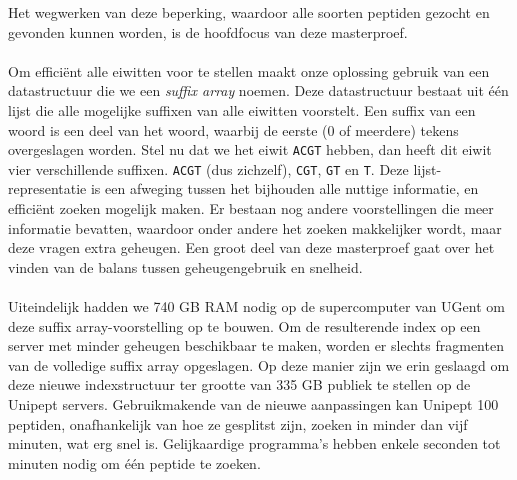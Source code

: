 Het wegwerken van deze beperking, waardoor alle soorten peptiden gezocht en gevonden kunnen worden, is de hoofdfocus van deze masterproef.
\\ \\
Om efficiënt alle eiwitten voor te stellen maakt onze oplossing gebruik van een datastructuur die we een \textit{suffix array} noemen.
Deze datastructuur bestaat uit één lijst die alle mogelijke suffixen van alle eiwitten voorstelt.
Een suffix van een woord is een deel van het woord, waarbij de eerste (0 of meerdere) tekens overgeslagen worden.
Stel nu dat we het eiwit \texttt{ACGT} hebben, dan heeft dit eiwit vier verschillende suffixen.
\texttt{ACGT} (dus zichzelf), \texttt{CGT}, \texttt{GT} en \texttt{T}.
Deze lijst-representatie is een afweging tussen het bijhouden alle nuttige informatie, en efficiënt zoeken mogelijk maken.
Er bestaan nog andere voorstellingen die meer informatie bevatten, waardoor onder andere het zoeken makkelijker wordt, maar deze vragen extra geheugen.
Een groot deel van deze masterproef gaat over het vinden van de balans tussen geheugengebruik en snelheid.
\\ \\
Uiteindelijk hadden we 740 GB RAM nodig op de supercomputer van UGent om deze suffix array-voorstelling op te bouwen.
Om de resulterende index op een server met minder geheugen beschikbaar te maken, worden er slechts fragmenten van de volledige suffix array opgeslagen.
Op deze manier zijn we erin geslaagd om deze nieuwe indexstructuur ter grootte van 335 GB publiek te stellen op de Unipept servers.
Gebruikmakende van de nieuwe aanpassingen kan Unipept 100 peptiden, onafhankelijk van hoe ze gesplitst zijn, zoeken in minder dan vijf minuten, wat erg snel is.
Gelijkaardige programma's hebben enkele seconden tot minuten nodig om één peptide te zoeken.